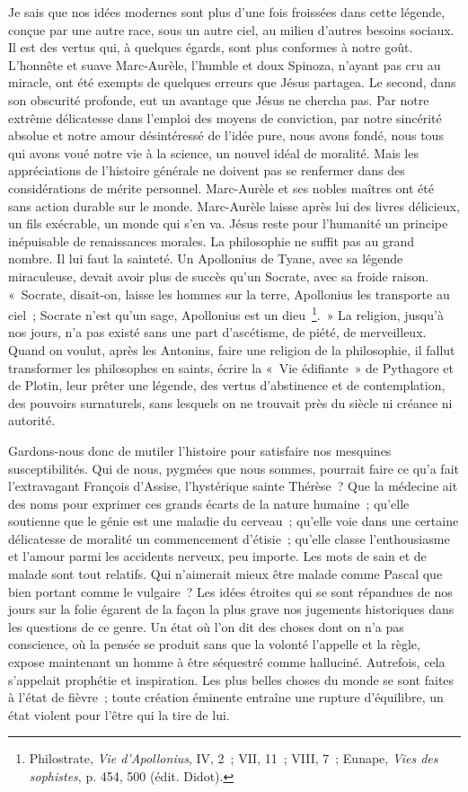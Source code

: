 \documentclass[french,twoside]{book} %
\begin{document}
Je sais que nos idées modernes sont plus d’une fois froissées dans cette légende, conçue par une autre race, sous un autre ciel, au milieu d’autres besoins sociaux. Il est des vertus qui, à quelques égards, sont plus conformes à notre goût. L’honnête et suave Marc-Aurèle, l’humble et doux Spinoza, n’ayant pas cru au miracle, ont été exempts de quelques erreurs que Jésus partagea. Le second, dans son obscurité profonde, eut un avantage que Jésus ne chercha pas. Par notre extrême délicatesse dans l’emploi des moyens de conviction, par notre sincérité absolue et notre amour désintéressé de l’idée pure, nous avons fondé, nous tous qui avons voué notre vie à la science, un nouvel idéal de moralité. Mais les appréciations de l’histoire générale ne doivent pas se renfermer dans des considérations de mérite personnel. Marc-Aurèle et ses nobles maîtres ont été sans action durable sur le monde. Marc-Aurèle laisse après lui des livres délicieux, un fils exécrable, un monde qui s’en va. Jésus reste pour l’humanité un principe inépuisable de renaissances morales. La philosophie ne suffit pas au grand nombre. Il lui faut la sainteté. Un Apollonius de Tyane, avec sa légende miraculeuse, devait avoir plus de succès qu’un Socrate, avec sa froide raison. « Socrate, disait-on, laisse les hommes sur la terre, Apollonius les transporte au ciel ; Socrate n’est qu’un sage, Apollonius est un dieu \footnote{ Philostrate, {\itshape Vie d’Apollonius}, IV, 2 ; VII, 11 ; VIII, 7 ; Eunape, {\itshape Vies des sophistes}, p. 454, 500 (édit. Didot).}. » La religion, jusqu’à nos jours, n’a pas existé sans une part d’ascétisme, de piété, de merveilleux. Quand on voulut, après les Antonins, faire une religion de la philosophie, il fallut transformer les philosophes en saints, écrire la « Vie édifiante » de Pythagore et de Plotin, leur prêter une légende, des vertus d’abstinence et de contemplation, des pouvoirs surnaturels, sans lesquels on ne trouvait près du siècle ni créance ni autorité.\par
Gardons-nous donc de mutiler l’histoire pour satisfaire nos mesquines susceptibilités. Qui de nous, pygmées que nous sommes, pourrait faire ce qu’a fait l’extravagant François d’Assise, l’hystérique sainte Thérèse ? Que la médecine ait des noms pour exprimer ces grands écarts de la nature humaine ; qu’elle soutienne que le génie est une maladie du cerveau ; qu’elle voie dans une certaine délicatesse de moralité un commencement d’étisie ; qu’elle classe l’enthousiasme et l’amour parmi les accidents nerveux, peu importe. Les mots de sain et de malade sont tout relatifs. Qui n’aimerait mieux être malade comme Pascal que bien portant comme le vulgaire ? Les idées étroites qui se sont répandues de nos jours sur la folie égarent de la façon la plus grave nos jugements historiques dans les questions de ce genre. Un état où l’on dit des choses dont on n’a pas conscience, où la pensée se produit sans que la volonté l’appelle et la règle, expose maintenant un homme à être séquestré comme halluciné. Autrefois, cela s’appelait prophétie et inspiration. Les plus belles choses du monde se sont faites à l’état de fièvre ; toute création éminente entraîne une rupture d’équilibre, un état violent pour l’être qui la tire de lui.\par
\end{document}
